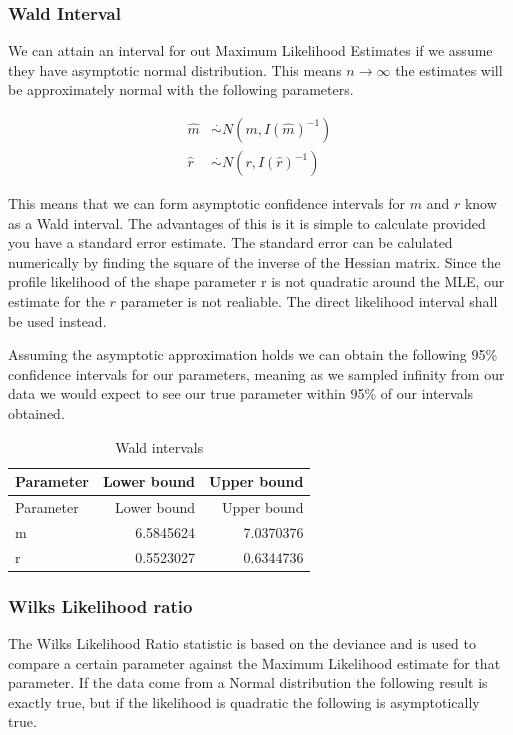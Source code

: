 \documentclass[11pt,preprint, authoryear]{elsarticle}
\numberwithin{equation}{section}
\numberwithin{figure}{section}
\numberwithin{table}{section}
\begin{document}
\subsubsection{\texorpdfstring{Wald Interval
\label{WaldyBoi}}{Wald Interval }}\label{wald-interval}

We can attain an interval for out Maximum Likelihood Estimates if we
assume they have asymptotic normal distribution. This means
\(n\to\infty\) the estimates will be approximately normal with the
following parameters.

\begin{align*}
\hat{m} & \stackrel{.}{\sim} N(m,I(\hat{m})^{-1}) \\
\hat{r} & \stackrel{.}{\sim} N(r,I(\hat{r})^{-1})
\end{align*}

This means that we can form asymptotic confidence intervals for \(m\)
and \(r\) know as a Wald interval. The advantages of this is it is
simple to calculate provided you have a standard error estimate. The
standard error can be calulated numerically by finding the square of the
inverse of the Hessian matrix. Since the profile likelihood of the shape
parameter r is not quadratic around the MLE, our estimate for the \(r\)
parameter is not realiable. The direct likelihood interval shall be used
instead.

Assuming the asymptotic approximation holds we can obtain the following
95\% confidence intervals for our parameters, meaning as we sampled
infinity from our data we would expect to see our true parameter within
95\% of our intervals obtained.

\begin{longtable}[]{@{}lrr@{}}
\caption{Wald intervals}\tabularnewline
\toprule
Parameter & Lower bound & Upper bound\tabularnewline
\midrule
\endfirsthead
\toprule
Parameter & Lower bound & Upper bound\tabularnewline
\midrule
\endhead
m & 6.5845624 & 7.0370376\tabularnewline
r & 0.5523027 & 0.6344736\tabularnewline
\bottomrule
\end{longtable}

\subsubsection{Wilks Likelihood ratio}\label{wilks-likelihood-ratio}

The Wilks Likelihood Ratio statistic is based on the deviance and is
used to compare a certain parameter against the Maximum Likelihood
estimate for that parameter. If the data come from a Normal distribution
the following result is exactly true, but if the likelihood is quadratic
the following is asymptotically true.
\end{document}
